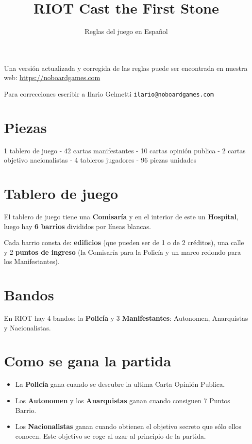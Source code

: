 \documentclass[a4paper,13pt]{scrartcl}
\title{RIOT Cast the First Stone}
\subtitle{Reglas del juego en Espa\~nol}
\author{}
\date{}
\begin{document}
\maketitle

Una versi\'on actualizada y corregida de las reglas puede ser encontrada en nuestra web:
\url{https://noboardgames.com} 

Para correcciones escribir a Ilario Gelmetti \texttt{ilario@noboardgames.com}

\section*{Piezas}
1 tablero de juego - 42 cartas manifestantes - 10 cartas opini\'on publica - 2 cartas objetivo nacionalistas - 4
tableros jugadores - 96 piezas unidades

\section*{Tablero de juego}
El tablero de juego tiene una \textbf{Comisar\'ia} y en el interior de este un \textbf{Hospital}, luego hay \textbf{6 barrios} divididos por
l\'ineas blancas.

Cada barrio consta de: \textbf{edificios} (que pueden ser de 1 o de 2 cr\'editos), una calle y 2 \textbf{puntos de ingreso} (la
Comisar\'ia para la Polic\'ia y un marco redondo para los Manifestantes).

\section*{Bandos}
En RIOT hay 4 bandos: la \textbf{Polic\'ia} y 3 \textbf{Manifestantes}: Autonomen, Anarquistas y Nacionalistas.

\section*{Como se gana la partida}
\begin{itemize}
\item La \textbf{Polic\'ia} gana cuando se descubre la ultima Carta Opini\'on Publica.
\item Los \textbf{Autonomen} y los \textbf{Anarquistas} ganan cuando consiguen 7 Puntos Barrio.
\item Los \textbf{Nacionalistas} ganan cuando obtienen el objetivo secreto que s\'olo ellos conocen. Este objetivo se coge al
azar al principio de la partida.
\end{itemize}
\end{document}

